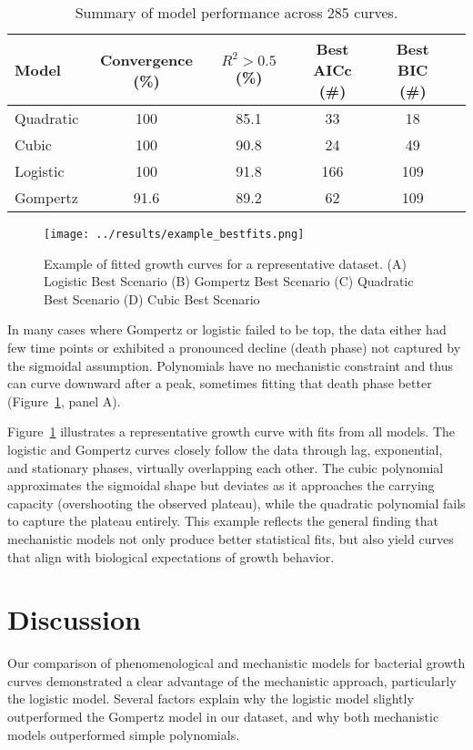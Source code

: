 \documentclass[11pt]{article}
\begin{document}
\begin{table}[htbp]
\centering
\begin{tabular}{lccccc}
\toprule
\textbf{Model} & \textbf{Convergence (\%)} & \textbf{$R^2>0.5$ (\%)} & \textbf{Best AICc (\#)} & \textbf{Best BIC (\#)}\\
\midrule
Quadratic & 100 & 85.1 & 33 & 18\\
Cubic     & 100 & 90.8 & 24 & 49\\
Logistic  & 100 & 91.8 & 166 & 109\\
Gompertz  & 91.6 & 89.2 & 62 & 109\\
\bottomrule
\end{tabular}
\caption{Summary of model performance across 285 curves.}
\label{tab:tab1}
\end{table}

\begin{figure}[htbp]
\centering
\texttt{[image: ../results/example\_bestfits.png]}
\caption{Example of fitted growth curves for a representative dataset. (A) Logistic Best Scenario  (B) Gompertz Best Scenario (C) Quadratic Best Scenario (D) Cubic Best Scenario}
\label{fig:fourcurves}
\end{figure}

In many cases where Gompertz or logistic failed to be top, the data either had few time points or exhibited a pronounced decline (death phase) not captured by the sigmoidal assumption. Polynomials have no mechanistic constraint and thus can curve downward after a peak, sometimes fitting that death phase better (Figure~\ref{fig:fourcurves}, panel A).

Figure~\ref{fig:fourcurves} illustrates a representative growth curve with fits from all models. The logistic and Gompertz curves closely follow the data through lag, exponential, and stationary phases, virtually overlapping each other. The cubic polynomial approximates the sigmoidal shape but deviates as it approaches the carrying capacity (overshooting the observed plateau), while the quadratic polynomial fails to capture the plateau entirely. This example reflects the general finding that mechanistic models not only produce better statistical fits, but also yield curves that align with biological expectations of growth behavior.

\section{Discussion}
Our comparison of phenomenological and mechanistic models for bacterial growth curves demonstrated a clear advantage of the mechanistic approach, particularly the logistic model. Several factors explain why the logistic model slightly outperformed the Gompertz model in our dataset, and why both mechanistic models outperformed simple polynomials.
\end{document}
